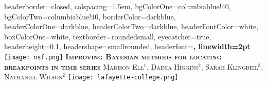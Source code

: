 \documentclass[landscape,a0paper,fontscale=0.285]{baposter} %
\begin{document}
\begin{poster}
{
headerborder=closed, %
colspacing=1.5em, %
bgColorOne=columbiablue!40, %
bgColorTwo=columbiablue!40, %
borderColor=darkblue, %
headerColorOne=darkblue, %
headerColorTwo=darkblue, %
headerFontColor=white, %
boxColorOne=white, %
textborder=roundedsmall, %
eyecatcher=true, %
headerheight=0.1\textheight, %
headershape=smallrounded, %
headerfont=\Large\bf\textsc, %
linewidth=2pt %
}
%
{\texttt{[image: nsf.png]}} %
{\bf\textsc{Improving Bayesian methods for locating breakpoints in time series}\vspace{0.5em}} %
{\textsc{ {\LARGE Madison Ell$^{1}$, Dainia Higgins$^{2}$, Sarah Klingbeil$^{3}$, Nathaniel Wilson$^{2}$ \hspace{12pt} }  } }%
{\texttt{[image: lafayette-college.png]}} %



\end{poster}
\end{document}

